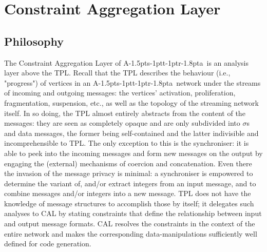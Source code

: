 \documentclass[11pt]{report}
\def\ak{{\textsf{A\kern-1.5pts\kern-1ptt\kern-1ptr\kern-1.8pta}}\kern-2pt{\it K\kern-2ptahn}}
\begin{document}
\chapter{Constraint Aggregation Layer}

\section{Philosophy}

The Constraint Aggregation Layer of \ak\ is an analysis layer above the TPL. Recall that the TPL describes the behaviour (i.e., "progress") of vertices in an \ak\ network under the streams of incoming and outgoing messages: the vertices' activation, proliferation, fragmentation, suspension, etc., as well as the topology of the streaming network itself. In so doing, the TPL almost entirely abstracts from the content of the messages: they are seen as completely opaque and are only subdivided into $\sigma$s and data messages, the former being self-contained and the latter indivisible and incomprehensible to TPL. The only exception to this is the synchroniser: it is able to peek into the incoming messages and form new messages on the output by engaging the (external) mechanisms of coercion and concatenation. Even there the invasion of the message privacy is minimal: a synchroniser is empowered to determine the variant of, and/or extract integers from an input message, and to combine messages and/or integers into a new message. TPL does not have the knowledge of message structures to accomplish those by itself; it delegates such analyses to CAL by stating constraints that define the relationship between input and output message formats. CAL resolves the constraints in the context of the entire network and makes the corresponding data-manipulations sufficiently well defined for code generation.
\end{document}
